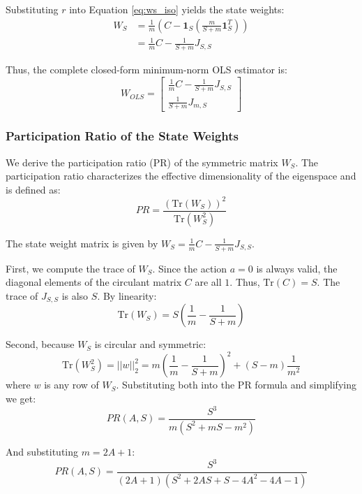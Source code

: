 \documentclass{article}
\begin{document}
Substituting $r$ into Equation \ref{eq:ws_iso} yields the state weights:
\begin{align}
    W_S &= \frac{1}{m} \left(C - \mathbf{1}_S \left(\frac{m}{S+m} \mathbf{1}_S^T\right)\right) \nonumber \\
    &= \frac{1}{m} C - \frac{1}{S+m} J_{S, S}
\end{align}

Thus, the complete closed-form minimum-norm OLS estimator is:
\begin{equation}
    W_{OLS} = \begin{bmatrix} \frac{1}{m} C - \frac{1}{S+m} J_{S, S} \\[1em] \frac{1}{S+m} J_{m, S} \end{bmatrix}
\end{equation}

\subsubsection{Participation Ratio of the State Weights}

We derive the participation ratio (PR) of the symmetric matrix $W_S$. The participation ratio characterizes the effective dimensionality of the eigenspace and is defined as:
\begin{equation}
    PR = \frac{(\text{Tr}(W_S))^2}{\text{Tr}(W_S^2)}
\end{equation}

The state weight matrix is given by $W_S = \frac{1}{m} C - \frac{1}{S+m} J_{S,S}$.

First, we compute the trace of $W_S$. Since the action $a=0$ is always valid, the diagonal elements of the circulant matrix $C$ are all $1$. Thus, $\text{Tr}(C) = S$. The trace of $J_{S,S}$ is also $S$. By linearity:
\begin{equation}
    \text{Tr}(W_S) = S (\frac{1}{m} - \frac{1}{S+m})
\end{equation}

Second, because $W_S$ is circular and symmetric:
\begin{equation}
    \text{Tr}(W_S^2) = ||w||^2_2 = m(\frac{1}{m} - \frac{1}{S+m})^2 + (S-m) \frac{1}{m^2}
\end{equation}
where $w$ is any row of $W_S$. Substituting both into the PR formula and simplifying we get:
\begin{equation}
    PR(A, S) = \frac{S^3}{m(S^2+mS-m^2)}
\end{equation}

And substituting $m=2A+1$:
\begin{equation}
    PR(A, S) = \frac{S^3}{\left(2A+1\right)\left(S^2+2AS+S-4A^2-4A-1\right)}
\end{equation}
\end{document}
